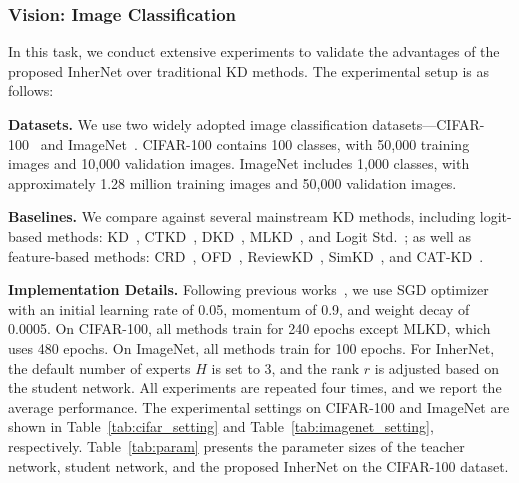 \documentclass{article} %
\begin{document}
\subsubsection{Vision: Image Classification}

In this task, we conduct extensive experiments to validate the advantages of the proposed InherNet over traditional KD methods. The experimental setup is as follows:

\textbf{Datasets.} We use two widely adopted image classification datasets—CIFAR-100~\citep{krizhevsky2009learning} and ImageNet~\citep{russakovsky2015imagenet}. CIFAR-100 contains 100 classes, with 50,000 training images and 10,000 validation images. ImageNet includes 1,000 classes, with approximately 1.28 million training images and 50,000 validation images.

\textbf{Baselines.} We compare against several mainstream KD methods, including logit-based methods: KD~\citep{hinton2015distilling}, CTKD~\citep{li2022curriculum}, DKD~\citep{zhao2022decoupled}, MLKD~\citep{jin2023multi}, and Logit Std.~\citep{sun2024logit}; as well as feature-based methods: CRD~\citep{peng2019correlation}, OFD~\citep{heo2019comprehensive}, ReviewKD~\citep{chen2021distilling}, SimKD~\citep{chen2022knowledge}, and CAT-KD~\citep{guo2023class}.

\textbf{Implementation Details.} Following previous works~\citep{chen2021distilling, zhao2022decoupled, jin2023multi, sun2024logit}, we use SGD optimizer with an initial learning rate of 0.05, momentum of 0.9, and weight decay of 0.0005. On CIFAR-100, all methods train for 240 epochs except MLKD, which uses 480 epochs. On ImageNet, all methods train for 100 epochs. For InherNet, the default number of experts $H$ is set to 3, and the rank $r$ is adjusted based on the student network. All experiments are repeated four times, and we report the average performance. The experimental settings on CIFAR-100 and ImageNet are shown in Table~\ref{tab:cifar_setting} and Table~\ref{tab:imagenet_setting}, respectively. Table~\ref{tab:param} presents the parameter sizes of the teacher network, student network, and the proposed InherNet on the CIFAR-100 dataset.
\end{document}

